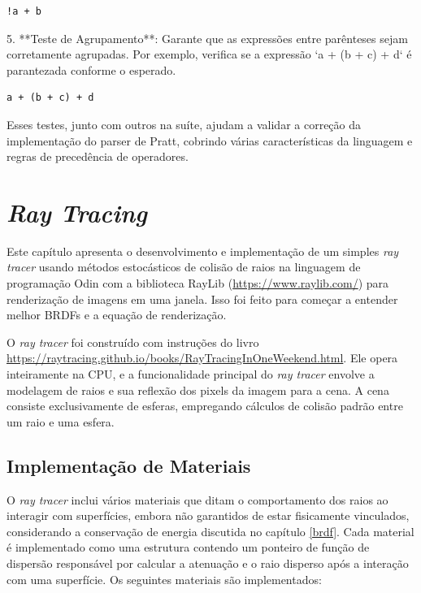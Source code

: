 \documentclass[english, 
               brazil, 
               bsc] %
               {dcomp-abntex2}
\begin{document}
\begin{verbatim}
!a + b
\end{verbatim}

5. **Teste de Agrupamento**: Garante que as expressões entre parênteses sejam corretamente agrupadas. Por exemplo, verifica se a expressão `a + (b + c) + d` é parantezada conforme o esperado.

\begin{verbatim}
a + (b + c) + d
\end{verbatim}

Esses testes, junto com outros na suíte, ajudam a validar a correção da implementação do parser de Pratt, cobrindo várias características da linguagem e regras de precedência de operadores.


\section{\textit{Ray Tracing} } \label{raytracer}


Este capítulo apresenta o desenvolvimento e implementação de um simples \textit{ray tracer} usando métodos estocásticos de colisão de raios na linguagem de programação Odin com a biblioteca RayLib (\url{https://www.raylib.com/}) para renderização de imagens em uma janela. Isso foi feito para começar a entender melhor BRDFs e a equação de renderização.

O \textit{ray tracer} foi construído com instruções do livro \url{https://raytracing.github.io/books/RayTracingInOneWeekend.html}. Ele opera inteiramente na CPU, e a funcionalidade principal do \textit{ray tracer} envolve a modelagem de raios e sua reflexão dos pixels da imagem para a cena. A cena consiste exclusivamente de esferas, empregando cálculos de colisão padrão entre um raio e uma esfera.

\subsection{Implementação de Materiais}

O \textit{ray tracer} inclui vários materiais que ditam o comportamento dos raios ao interagir com superfícies, embora não garantidos de estar fisicamente vinculados, considerando a conservação de energia discutida no capítulo \ref{brdf}. Cada material é implementado como uma estrutura contendo um ponteiro de função de dispersão responsável por calcular a atenuação e o raio disperso após a interação com uma superfície. Os seguintes materiais são implementados:
\end{document}
